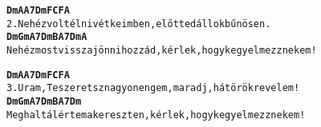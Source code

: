 \begin{minipage}{\textwidth}
\kottastart
{}
\kottaend
\begin{minipage}{\textwidth}
\begin{alltt}
\textbf{    Dm        A     A7 Dm      F       C          F   A}
2. Nehéz volt élni vétkeimben, előtted állok bűnösen.
\textbf{    Dm         Gm        A7   Dm   B            A7           Dm  A}
   Nehéz most visszajönni hozzád, kérlek, hogy kegyelmezz nekem!
\end{alltt}
\vspace{0.0cm}
\versszakspacing
\end{minipage}
\begin{minipage}{\textwidth}
\begin{alltt}
\textbf{   Dm         A       A7    Dm      F          C         F   A}
3. Uram, Te szeretsz nagyon engem, maradj, hát örökre velem!
\textbf{    Dm       Gm         A7  Dm   B            A7           Dm}
   Meghaltál értem a kereszten, kérlek, hogy kegyelmezz nekem!
\end{alltt}
\vspace{0.0cm}
\versszakspacing
\end{minipage}
\end{minipage}
~\vspace{1.0cm}
\newline
